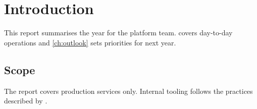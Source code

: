 \chapter{Introduction}
\label{ch:introduction}

This report summarises the year for the platform team.
 covers day-to-day operations and \cref{ch:outlook} sets priorities for next year.

\section{Scope}
\label{sec:scope}

The report covers production services only.
Internal tooling follows the practices described by \citet{beyer2016}.

